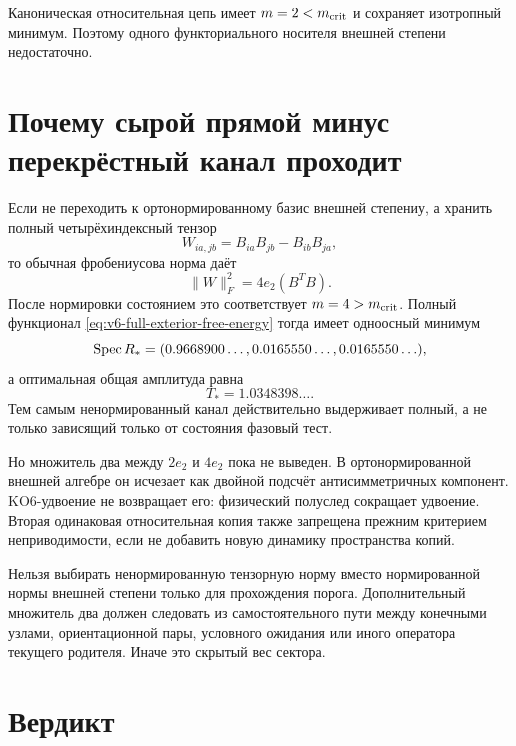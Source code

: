 Каноническая относительная цепь имеет $m=2<m_{\rm crit}$ и сохраняет
изотропный минимум. Поэтому одного функториального носителя внешней степени
недостаточно.

\section{Почему сырой прямой минус перекрёстный канал проходит}

Если не переходить к ортонормированному базис внешней степениу, а хранить полный
четырёхиндексный тензор
\begin{equation}
 W_{ia,jb}=B_{ia}B_{jb}-B_{ib}B_{ja},
\end{equation}
то обычная фробениусова норма даёт
\begin{equation}
 \|W\|_F^2=4e_2(B^TB).
 \label{eq:v6-raw-tensor-exterior-factor-four}
\end{equation}
После нормировки состоянием это соответствует $m=4>m_{\rm crit}$.
Полный функционал \eqref{eq:v6-full-exterior-free-energy} тогда имеет
одноосный минимум
\begin{equation}
 \operatorname{Spec} R_*
 =(0.9668900\ldots,0.0165550\ldots,0.0165550\ldots),
 \label{eq:v6-full-raw-wedge-spectrum}
\end{equation}
а оптимальная общая амплитуда равна
\begin{equation}
 T_*=1.0348398\ldots.
\end{equation}
Тем самым ненормированный канал действительно выдерживает полный, а не только
зависящий только от состояния фазовый тест.

Но множитель два между $2e_2$ и $4e_2$ пока не выведен. В
ортонормированной внешней алгебре он исчезает как двойной подсчёт
антисимметричных компонент. KO6-удвоение не возвращает его: физический
полуслед сокращает удвоение. Вторая одинаковая относительная копия также
запрещена прежним критерием неприводимости, если не добавить новую
динамику пространства копий.

\begin{nogocriterion}
Нельзя выбирать ненормированную тензорную норму вместо нормированной нормы внешней степени только
для прохождения порога. Дополнительный множитель два должен следовать из
самостоятельного пути между конечными узлами, ориентационной пары, условного ожидания или
иного оператора текущего родителя. Иначе это скрытый вес сектора.
\end{nogocriterion}

\section{Вердикт}

